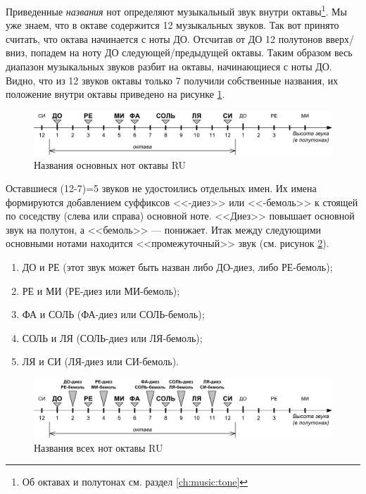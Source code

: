 Приведенные \emph{названия} нот определяют музыкальный звук внутри октавы\footnote{Об октавах и полутонах см. раздел \ref{ch:music:tone}}. Мы уже знаем, что в октаве содержится 12 музыкальных звуков. Так вот принято считать, что октава начинается с ноты ДО. Отсчитав от ДО 12 полутонов вверх/вниз, попадем на ноту ДО следующей/предыдущей октавы. Таким образом весь диапазон музыкальных звуков разбит на октавы, начинающиеся с ноты ДО. Видно, что из 12 звуков октавы только 7 получили собственные названия, их положение внутри октавы приведено на рисунке \ref{fig:notes:names:main:RU}.

\begin{figure}[!ht]
    \centering
    \includegraphics[width=\textwidth]{fig/notes/notes-main-ru} 
    \caption{Названия основных нот октавы RU}\label{fig:notes:names:main:RU}
\end{figure} 

Оставшиеся (12-7)=5 звуков не удостоились отдельных имен. Их имена формируются добавлением суффиксов <<-диез>> или <<-бемоль>> к стоящей по соседству (слева или справа) основной ноте. <<Диез>> повышает основной звук на полутон, а <<бемоль>> --- понижает. Итак между следующими основными нотами находится <<промежуточный>> звук (см. рисунок \ref{fig:notes:names:all:RU}).
\begin{enumerate}
    \item ДО и РЕ (этот звук может быть назван либо ДО-диез, либо РЕ-бемоль);
    \item РЕ и МИ (РЕ-диез или МИ-бемоль);
    \item ФА и СОЛЬ (ФА-диез или СОЛЬ-бемоль);
    \item СОЛЬ и ЛЯ (СОЛЬ-диез или ЛЯ-бемоль);
    \item ЛЯ и СИ (ЛЯ-диез или СИ-бемоль).
\end{enumerate}

\begin{figure}[!ht]
    \centering
    \includegraphics[width=\textwidth]{fig/notes/notes-all-ru} 
    \caption{Названия всех нот октавы RU}\label{fig:notes:names:all:RU}
\end{figure} 

